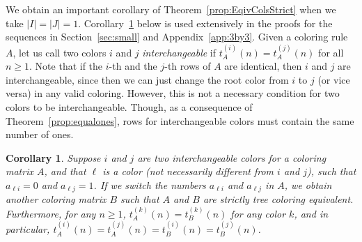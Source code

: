\documentclass[12pt]{amsart}
\newtheorem{corollary}{Corollary}
\begin{document}
We obtain an important corollary of Theorem~\ref{prop:EqivColsStrict} when we take $|I|=|J|=1$. Corollary~\ref{cor:EqivCols} below is used
extensively in the proofs for the sequences in Section~\ref{sec:small} and Appendix~\ref{app:3by3}. 
Given a coloring rule $A$, let us call two colors $i$ and $j$ \emph{interchangeable} if
$t^{(i)}_A(n)=t^{(j)}_A(n)$ for all $n\geq1$. Note that if the $i$-th and the $j$-th rows of $A$ are identical, then $i$ and $j$ are interchangeable, since then we can just change the root color from $i$ to $j$ (or vice versa) in any valid coloring. However, this is not a necessary condition for two colors to be interchangeable. Though, as a consequence of Theorem~\ref{prop:equalones}, rows for interchangeable colors must contain the same number of ones.



\begin{corollary}
\label{cor:EqivCols}
Suppose $i$ and $j$ are two interchangeable colors for a coloring matrix $A$, and that $\ell$ is a color (not necessarily different from $i$ and $j$), such that 
$a_{\ell i} = 0$ and $a_{\ell j} = 1$. If we switch the numbers $a_{\ell i}$ and $a_{\ell j}$ in $A$, we obtain another coloring matrix $B$ such that $A$ and $B$ are strictly tree coloring equivalent.
Furthermore, for any $n\geq1$, 
$t^{(k)}_A(n)=t^{(k)}_{B}(n)$ for any color $k$, and 
in particular, $t^{(i)}_A(n)=t^{(j)}_A(n)=t^{(i)}_{B}(n)=t^{(j)}_{B}(n)$.
\end{corollary}
\end{document}

